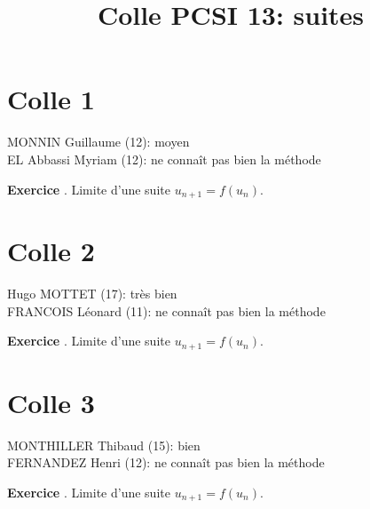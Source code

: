 \documentclass[10pt,a4paper]{article}
\title{Colle PCSI 13: suites}
\newcounter{question}
\newcounter{exo}
\newenvironment{exo}{\vspace{0.5cm}\setcounter{question}{0}\addtocounter{exo}{1} \noindent \textbf{Exercice \theexo}. \normalsize }{\par}
\begin{document}
	\maketitle

	\section*{Colle 1}
	MONNIN Guillaume (12): moyen\\
	EL Abbassi Myriam (12): ne connaît pas bien la méthode\\
	
	\begin{exo}
		Limite d'une suite $u_{n+1} = f(u_n)$.
	\end{exo}	
	
	\section*{Colle 2}
	\setcounter{exo}{0}
	Hugo MOTTET (17): très bien\\
	FRANCOIS Léonard (11): ne connaît pas bien la méthode\\
	
	\begin{exo}
		Limite d'une suite $u_{n+1} = f(u_n)$.
	\end{exo}	
	
	\section*{Colle 3}
	\setcounter{exo}{0}
	MONTHILLER Thibaud (15): bien\\
	FERNANDEZ Henri (12): ne connaît pas bien la méthode\\
	
	\begin{exo}
		Limite d'une suite $u_{n+1} = f(u_n)$.
	\end{exo}	
\end{document}
